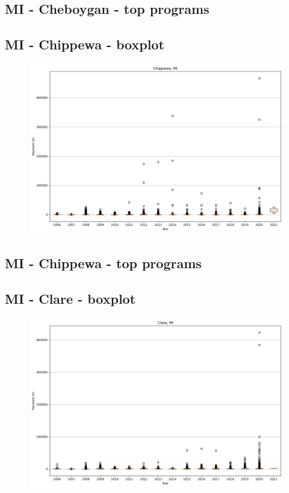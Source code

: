 \subsection*{MI - Cheboygan - top programs}

\newpage
\subsection*{MI - Chippewa - boxplot}
\begin{figure}[h]
\centering
\includegraphics[width=7in]{../output/boxplots/counties/Chippewa-MI_boxplot.png}
\end{figure}


\subsection*{MI - Chippewa - top programs}

\newpage
\subsection*{MI - Clare - boxplot}
\begin{figure}[h]
\centering
\includegraphics[width=7in]{../output/boxplots/counties/Clare-MI_boxplot.png}
\end{figure}


